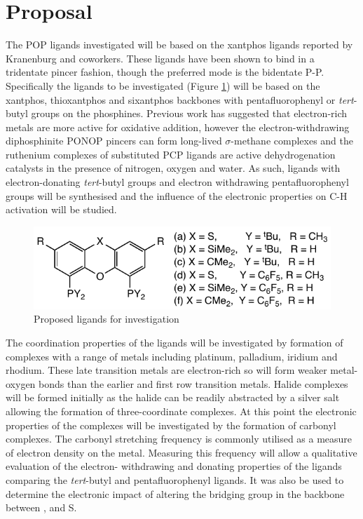 \section{Proposal}

The POP ligands investigated will be based on the xantphos ligands reported by Kranenburg and coworkers.\cite{Kranenburg1995}  These ligands have been shown to bind in a tridentate pincer fashion, though the preferred mode is the bidentate P-P.\cite{Nieczypor2001, Turculet2007, Sandee1999, Zuideveld2002}  Specifically the ligands to be investigated (Figure \ref{Proposedligands}) will be based on the xantphos, thioxantphos and sixantphos backbones with pentafluorophenyl or \emph{tert}-butyl groups on the phosphines.  Previous work has suggested that electron-rich metals are more active for oxidative addition, however the electron-withdrawing diphosphinite PONOP pincers can form long-lived $\sigma$-methane complexes\cite{Bernskoetter2009} and the ruthenium complexes of  substituted PCP ligands are active dehydrogenation catalysts in the presence of nitrogen, oxygen and water.\cite{Gruver2011}  As such, ligands with electron-donating \emph{tert}-butyl groups and electron withdrawing pentafluorophenyl groups will be synthesised and the influence of the electronic properties on C-H activation will be studied.

\begin{figure}[h]  
\centering
\includegraphics[]{../Figures/Proposedligands.pdf}
\caption[Proposed ligands for investigation]{Proposed ligands for investigation}
\label{Proposedligands}
\end{figure}

The coordination properties of the ligands will be investigated by formation of complexes with a range of metals including platinum, palladium, iridium and rhodium.  These late transition metals are electron-rich so will form weaker metal-oxygen bonds than the earlier and first row transition metals.  Halide complexes will be formed initially as the halide can be readily abstracted by a silver salt allowing the formation of three-coordinate complexes.  At this point the electronic properties of the complexes will be investigated by the formation of carbonyl complexes.  The carbonyl stretching frequency is commonly utilised as a measure of electron density on the metal.\cite{Tolman1977}  Measuring this frequency will allow a qualitative evaluation of the electron- withdrawing and donating properties of the ligands comparing the \emph{tert}-butyl and pentafluorophenyl ligands.  It was also be used to determine the electronic impact of altering the bridging group in the backbone between ,  and S.  

